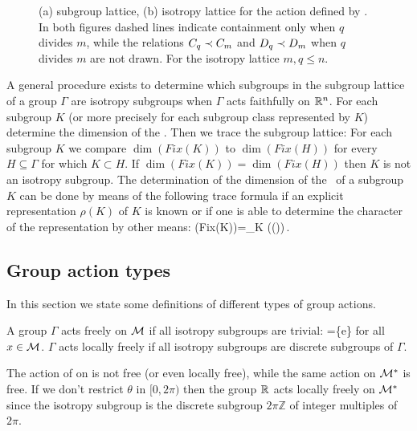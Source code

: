 \begin{example}
\begin{figure}
\begin{center}
\end{center}
\caption[O(2) lattices]{
    {\small
    (a)  subgroup lattice, (b)  isotropy lattice for the action
	defined by . In both figures dashed lines indicate
	containment only when $q$ divides $m$, while the relations $C_{q}\prec C_{m}$
	and $D_{q}\prec D_{m}$ when $q$ divides $m$ are not drawn. For the isotropy lattice $m,q\le n$.
	}}
\label{fig:O2lattice}
    \vspace*{-5pt}
\end{figure}

\end{example}

A general procedure exists to determine which subgroups in the subgroup lattice of a group $\Gamma$ are isotropy
subgroups when $\Gamma$ acts faithfully on $\mathbb{R}^{n}$.
For each subgroup $K$ (or more precisely for each subgroup class represented by $K$)
determine the dimension of the \fixedsp. Then we trace the subgroup lattice: For each subgroup
$K$ we compare $\dim(Fix(K))$ to $\dim(Fix(H))$ for every $H\subseteq\Gamma$ for which $K\subset H$.
If  $\dim(Fix(K))=\dim(Fix(H))$ then $K$ is not an isotropy subgroup. The determination of the dimension of the
\fixedsp\ of a subgroup $K$ can be done by means of the following trace formula if an explicit representation
$\rho(K)$ of $K$ is known or if one is able to determine the character of the representation by other means:
\beq
	\dim(Fix(K))=\sum_{\kappa\in K} \trace(\rho(\kappa))\,.
\eeq


\subsection{Group action types}

In this section we state some definitions of different types of group actions.

\begin{definition}
\label{def:free}
A group $\Gamma$ acts freely on $\mathcal{M}$ if all isotropy subgroups are trivial: =\{e\} for all $x\in \mathcal{M}$.
$\Gamma$ acts locally freely if all isotropy subgroups are discrete subgroups of $\Gamma$.
\end{definition}

\begin{example}
The action  of  on  is not free (or even locally free), while the same action on $\mathcal{M}^*$ is free. If we don't
restrict $\theta$ in $[0,2\pi)$ then the group $\mathbb{R}^{}$ acts locally freely on $\mathcal{M}^*$
since the isotropy subgroup is the discrete subgroup $2\pi\mathbb{Z}$ of integer multiples of $2\pi$.
\end{example}

